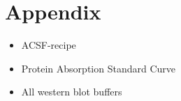 \chapter{Appendix}

\begin{itemize}
    \item ACSF-recipe
    \item Protein Absorption Standard Curve
    \item All western blot buffers
\end{itemize}
